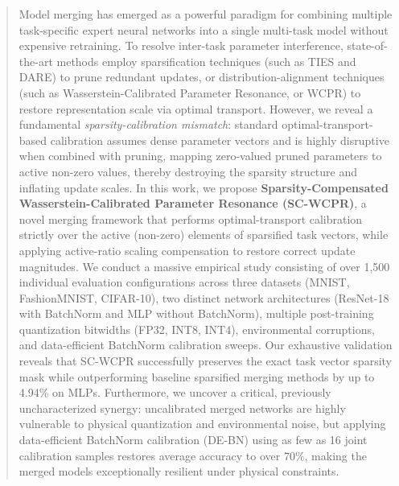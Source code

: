 \documentclass{article}
\theoremstyle{plain}
\theoremstyle{definition}
\theoremstyle{remark}
\begin{document}

\printAffiliationsAndNotice{}

\begin{abstract}
Model merging has emerged as a powerful paradigm for combining multiple task-specific expert neural networks into a single multi-task model without expensive retraining. 
To resolve inter-task parameter interference, state-of-the-art methods employ sparsification techniques (such as TIES and DARE) to prune redundant updates, or distribution-alignment techniques (such as Wasserstein-Calibrated Parameter Resonance, or WCPR) to restore representation scale via optimal transport. 
However, we reveal a fundamental \emph{sparsity-calibration mismatch}: standard optimal-transport-based calibration assumes dense parameter vectors and is highly disruptive when combined with pruning, mapping zero-valued pruned parameters to active non-zero values, thereby destroying the sparsity structure and inflating update scales. 
In this work, we propose \textbf{Sparsity-Compensated Wasserstein-Calibrated Parameter Resonance (SC-WCPR)}, a novel merging framework that performs optimal-transport calibration strictly over the active (non-zero) elements of sparsified task vectors, while applying active-ratio scaling compensation to restore correct update magnitudes. 
We conduct a massive empirical study consisting of over 1,500 individual evaluation configurations across three datasets (MNIST, FashionMNIST, CIFAR-10), two distinct network architectures (ResNet-18 with BatchNorm and MLP without BatchNorm), multiple post-training quantization bitwidths (FP32, INT8, INT4), environmental corruptions, and data-efficient BatchNorm calibration sweeps. 
Our exhaustive validation reveals that SC-WCPR successfully preserves the exact task vector sparsity mask while outperforming baseline sparsified merging methods by up to 4.94\% on MLPs. 
Furthermore, we uncover a critical, previously uncharacterized synergy: uncalibrated merged networks are highly vulnerable to physical quantization and environmental noise, but applying data-efficient BatchNorm calibration (DE-BN) using as few as 16 joint calibration samples restores average accuracy to over 70\%, making the merged models exceptionally resilient under physical constraints.
\end{abstract}
\end{document}
